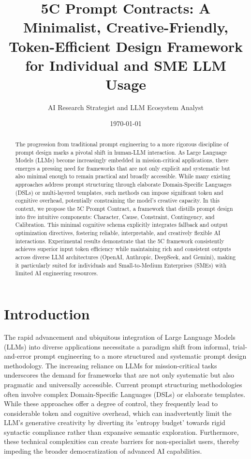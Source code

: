 \documentclass[10pt, a4paper]{article}
\title{5C Prompt Contracts: A Minimalist, Creative-Friendly, Token-Efficient Design Framework for Individual and SME LLM Usage}
\author{AI Research Strategist and LLM Ecosystem Analyst}
\date{\today}
\begin{document}
\maketitle

\begin{abstract}
The progression from traditional prompt engineering to a more rigorous discipline of prompt design marks a pivotal shift in human-LLM interaction. As Large Language Models (LLMs) become increasingly embedded in mission-critical applications, there emerges a pressing need for frameworks that are not only explicit and systematic but also minimal enough to remain practical and broadly accessible. While many existing approaches address prompt structuring through elaborate Domain-Specific Languages (DSLs) or multi-layered templates, such methods can impose significant token and cognitive overhead, potentially constraining the model's creative capacity.
In this context, we propose the 5C Prompt Contract, a framework that distills prompt design into five intuitive components: Character, Cause, Constraint, Contingency, and Calibration. This minimal cognitive schema explicitly integrates fallback and output optimization directives, fostering reliable, interpretable, and creatively flexible AI interactions. Experimental results demonstrate that the 5C framework consistently achieves superior input token efficiency while maintaining rich and consistent outputs across diverse LLM architectures (OpenAI, Anthropic, DeepSeek, and Gemini), making it particularly suited for individuals and Small-to-Medium Enterprises (SMEs) with limited AI engineering resources.
\end{abstract}

\section{Introduction}
The rapid advancement and ubiquitous integration of Large Language Models (LLMs) into diverse applications necessitate a paradigm shift from informal, trial-and-error prompt engineering to a more structured and systematic prompt design methodology. The increasing reliance on LLMs for mission-critical tasks underscores the demand for frameworks that are not only systematic but also pragmatic and universally accessible. Current prompt structuring methodologies often involve complex Domain-Specific Languages (DSLs) or elaborate templates. While these approaches offer a degree of control, they frequently lead to considerable token and cognitive overhead, which can inadvertently limit the LLM's generative creativity by diverting its 'entropy budget' towards rigid syntactic compliance rather than expansive semantic exploration. Furthermore, these technical complexities can create barriers for non-specialist users, thereby impeding the broader democratization of advanced AI capabilities.
\end{document}
